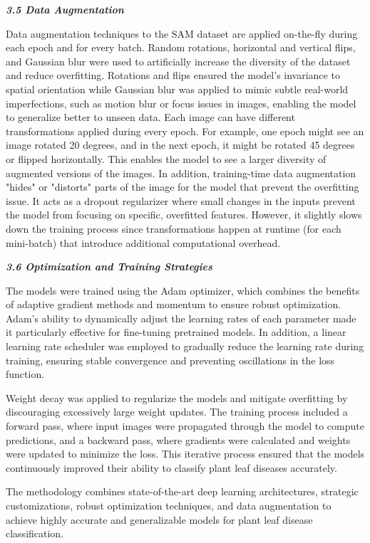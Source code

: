 \documentclass{article}
\begin{document}
\textbf{\textit{3.5 Data Augmentation}}

Data augmentation techniques to the SAM dataset are applied on-the-fly during each epoch and for every batch. Random rotations, horizontal and vertical flips, and Gaussian blur were used to artificially increase the diversity of the dataset and reduce overfitting. Rotations and flips ensured the model’s invariance to spatial orientation while Gaussian blur was applied to mimic subtle real-world imperfections, such as motion blur or focus issues in images, enabling the model to generalize better to unseen data. Each image can have different transformations applied during every epoch. For example, one epoch might see an image rotated 20 degrees, and in the next epoch, it might be rotated 45 degrees or flipped horizontally. This enables the model to see a larger diversity of augmented versions of the images. In addition, training-time data augmentation "hides" or "distorts" parts of the image for the model that prevent the overfitting issue. It acts as a dropout regularizer where small changes in the inputs prevent the model from focusing on specific, overfitted features. However, it slightly slows down the training process since transformations happen at runtime (for each mini-batch) that introduce additional computational overhead.

\textbf{\textit{3.6 Optimization and Training Strategies}}

The models were trained using the Adam optimizer, which combines the benefits of adaptive gradient methods and momentum to ensure robust optimization. Adam's ability to dynamically adjust the learning rates of each parameter made it particularly effective for fine-tuning pretrained models. In addition, a linear learning rate scheduler was employed to gradually reduce the learning rate during training, ensuring stable convergence and preventing oscillations in the loss function.

Weight decay was applied to regularize the models and mitigate overfitting by discouraging excessively large weight updates. The training process included a forward pass, where input images were propagated through the model to compute predictions, and a backward pass, where gradients were calculated and weights were updated to minimize the loss. This iterative process ensured that the models continuously improved their ability to classify plant leaf diseases accurately.

The methodology combines state-of-the-art deep learning architectures, strategic customizations, robust optimization techniques, and data augmentation to achieve highly accurate and generalizable models for plant leaf disease classification.
\end{document}
